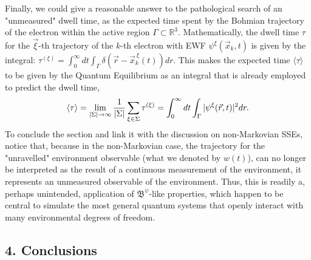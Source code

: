 \documentclass[11pt, a4paper]{article} %
\newcommand{\R}{\mathbb{R}} %
\newcommand{\B}{\mathfrak{B}}
\begin{document}
Finally, we could give a reasonable answer to the pathological search of an "unmeasured" dwell time, as the expected time spent by the Bohmian trajectory of the electron within the active region $\Gamma\subset \R^3$. Mathematically, the dwell time $\tau$ for the $\vec{\xi}$-th trajectory of the $k$-th electron with EWF $\psi^\xi(\vec{x}_k,t)$ is given by the integral: $\tau^{( \xi)}= \int_{0}^\infty  dt \int_\Gamma \delta(\vec{r}-\vec{x}_k^{\:\xi}(t)) dr$. This makes the expected time $\langle \tau\rangle$ to be given by the Quantum Equilibrium as an integral that is already employed to predict the dwell time,
\begin{equation}
\langle \tau \rangle = \lim_{|\Sigma|\rightarrow \infty}\frac{1}{|\Sigma|} \sum_{\xi\in\Sigma} \tau^{(\xi)} = \int_{0}^\infty dt \int_\Gamma |\psi^\xi(\vec{r},t)|^2dr.\vspace{-0.1cm}
\end{equation}
To conclude the section and link it with the discussion on non-Markovian SSEs, notice that, because in the non-Markovian case, the trajectory for the "unravelled" environment observable (what we denoted by $w(t)$), can no longer be interpreted as the result of a continuous measurement of the environment, it represents an unmeasured observable of the environment. Thus, this is readily a, perhaps unintended, application of $\B^\psi$-like properties, which happen to be central to simulate the most general quantum systems that openly interact with many environmental degrees of freedom. \vspace{-0.2cm}

\subsection*{4. Conclusions}\vspace{-0.15cm}
\end{document}
